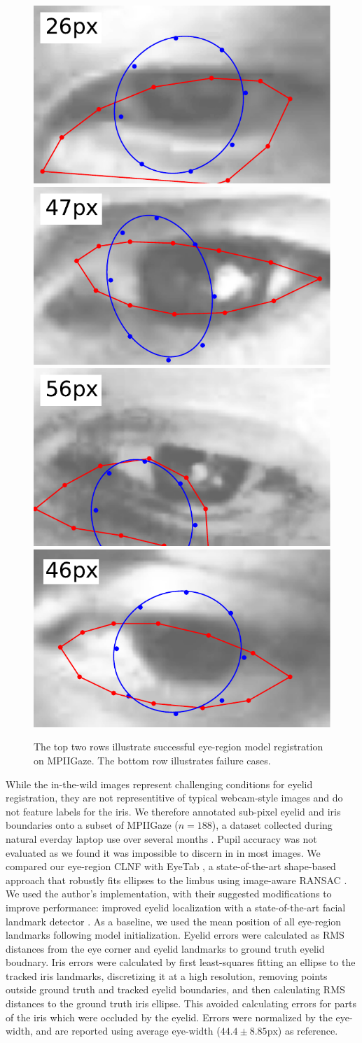 \begin{figure}
    \par \vspace{0.1em}
    \includegraphics[width=0.244\columnwidth]{figs/ldmks_examples/idx_4.pdf}\hfill
    \includegraphics[width=0.244\columnwidth]{figs/ldmks_examples/idx_26.pdf}\hfill
    \includegraphics[width=0.244\columnwidth]{figs/ldmks_examples/idx_134.pdf}\hfill
    \includegraphics[width=0.244\columnwidth]{figs/ldmks_examples/idx_83.pdf}
    \caption{The top two rows illustrate successful eye-region model registration on MPIIGaze. The bottom row illustrates failure cases.}
    \label{fig:clnf_examples}
\end{figure}

While the in-the-wild images represent challenging conditions for eyelid registration, they are not representitive of typical webcam-style images and do not feature labels for the iris.
We therefore annotated sub-pixel eyelid and iris boundaries onto a subset of MPIIGaze ($n\!=\!188$), a dataset collected during natural everday laptop use over several months \cite{zhang15_cvpr}.
Pupil accuracy was not evaluated as we found it was impossible to discern in in most images.
We compared our eye-region CLNF with EyeTab \cite{wood2014eyetab}, a state-of-the-art shape-based approach that robustly fits ellipses to the limbus using image-aware RANSAC \cite{swirski2012robust}.
We used the author's implementation, with their suggested modifications to improve performance: improved eyelid localization with a state-of-the-art facial landmark detector \cite{baltrusaitis2013constrained}.
As a baseline, we used the mean position of all eye-region landmarks following model initialization.
Eyelid errors were calculated as RMS distances from the eye corner and eyelid landmarks to ground truth eyelid boudnary.
Iris errors were calculated by first least-squares fitting an ellipse to the tracked iris landmarks, discretizing it at a high resolution, removing points outside ground truth and tracked eyelid boundaries, and then calculating RMS distances to the ground truth iris ellipse.
This avoided calculating errors for parts of the iris which were occluded by the eyelid.
Errors were normalized by the eye-width, and are reported using average eye-width ($44.4\!\pm\!8.85\textrm{px}$) as reference.

